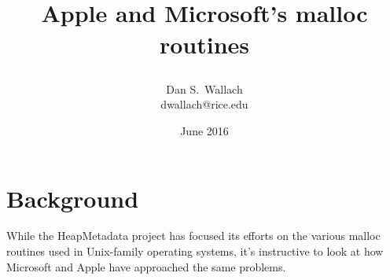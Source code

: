 \documentclass[12pt,onecolumn]{article}
\let\oldnewcommand=\newcommand
\let\newcommand=\providecommand
\let\newcommand=\oldnewcommand
\begin{document}
\newcommand{\CompTitle}{{\fontsize{22}{18}\kern0pt\fontfamily{pag}\selectfont{HeapMetadata:}}}                                                                       

\newcommand{\thetitle}{\CompTitle{}\\
\vspace{-2pt}

{\fontsize{16}{12}\fontfamily{pag}\selectfont Apple and Microsoft's
  malloc routines}}



\newcommand{\authorlist}{Dan S.~Wallach}
\newcommand{\authoremails}{dwallach@rice.edu}


\title{\thetitle}
\author{\authorlist\\\smaller\authoremails}
\date{June 2016}
\maketitle

\section{Background}
While the HeapMetadata project has focused its efforts on the various
{\sf malloc} routines used in Unix-family operating systems, it's
instructive to look at how Microsoft and Apple have approached the
same problems.






\end{document}
